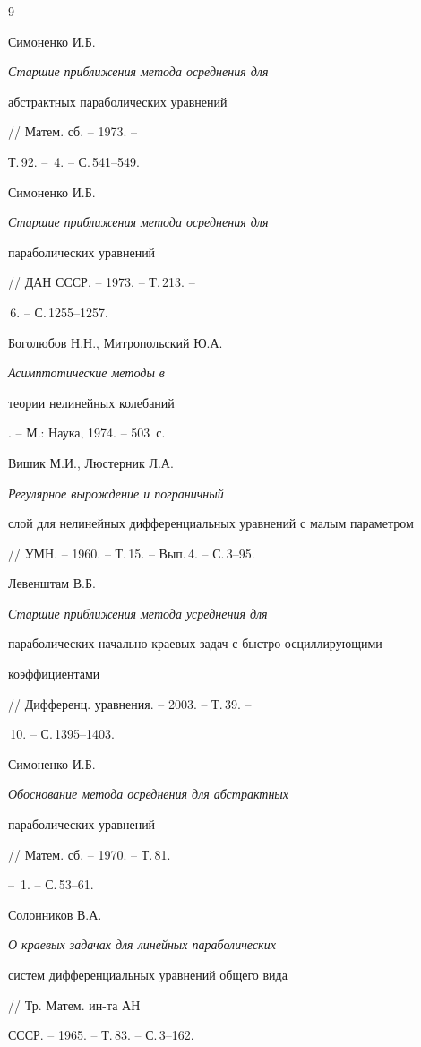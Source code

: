 \begin{thebibliography}{9}







Симоненко И.Б. {\em Старшие приближения метода осреднения для


абстрактных параболических уравнений} // Матем. сб. -- 1973. --


Т.\,92. -- \No\,4. -- С.\,541--549.







Симоненко И.Б. {\em Старшие приближения метода осреднения для


параболических уравнений} // ДАН СССР. -- 1973. -- Т.\,213. --


\No\,6. -- С.\,1255--1257.







Боголюбов Н.Н., Митропольский Ю.А. {\em Асимптотические методы в


теории нелинейных колебаний}. -- М.: Наука, 1974. -- 503~с.







Вишик М.И., Люстерник Л.А. {\em Регулярное вырождение и пограничный


слой для нелинейных дифференциальных уравнений с малым параметром}


// УМН. -- 1960. -- Т.\,15. -- Вып.\,4. -- \linebreak С.\,3--95.







Левенштам В.Б. {\em Старшие приближения метода усреднения для


параболических начально-краевых задач с быстро осциллирующими


коэффициентами} // Дифференц. уравнения. -- 2003. -- Т.\,39. --


\No\,10. -- С.\,1395--1403.







Симоненко И.Б. {\em Обоснование метода осреднения для абстрактных


параболических уравнений} // Матем. сб. -- 1970. -- Т.\,81.


-- \No\,1. -- С.\,53--61.







Солонников В.А. {\em О краевых задачах для линейных параболических


систем дифференциальных уравнений общего вида} // Тр. Матем. ин-та АН


СССР. -- 1965. -- Т.\,83. -- С.\,3--162.





\end{thebibliography}
